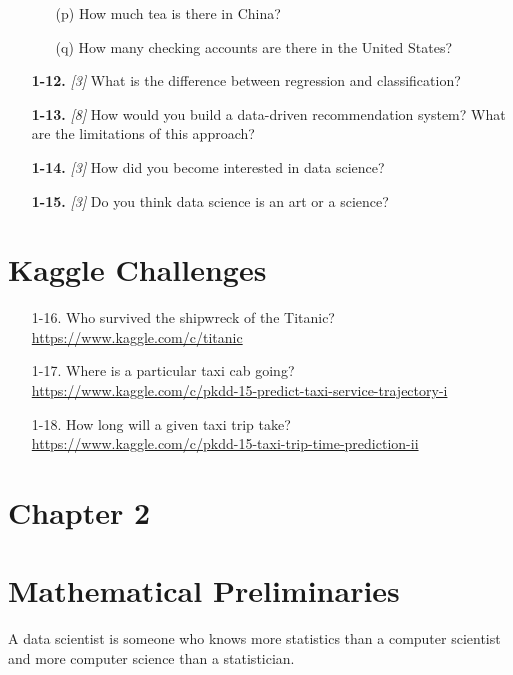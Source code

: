 \documentclass[10pt]{article}
\begin{document}
\begin{enumerate}
\begin{enumerate}
        \item [(p)] How much tea is there in China?
        \item [(q)] How many checking accounts are there in the United States?
    \end{enumerate}
    \item[\textbf{1-12.}] \textit{[3] } What is the difference between regression and classification?\\
    \item[\textbf{1-13.}] \textit{[8] } How would you build a data-driven recommendation system? What are the limitations of this approach?\\
    \item[\textbf{1-14.}] \textit{[3] } How did you become interested in data science?\\
    \item[\textbf{1-15.}] \textit{[3] } Do you think data science is an art or a science?
\end{enumerate}

\section*{Kaggle Challenges}
\begin{enumerate}
    \item[1-16.] Who survived the shipwreck of the Titanic?\\ \href{https://www.kaggle.com/c/titanic}{https://www.kaggle.com/c/titanic}
    \item[1-17.] Where is a particular taxi cab going? \\ \href{https://www.kaggle.com/c/pkdd-15-predict-taxi-service-trajectory-i}{https://www.kaggle.com/c/pkdd-15-predict-taxi-service-trajectory-i}
    \item[1-18.] How long will a given taxi trip take? \\
    \href{https://www.kaggle.com/c/pkdd-15-taxi-trip-time-prediction-ii}{https://www.kaggle.com/c/pkdd-15-taxi-trip-time-prediction-ii}
\end{enumerate}

\section*{Chapter 2}

\section*{Mathematical Preliminaries}
A data scientist is someone who knows more statistics than a computer scientist and more computer science than a statistician.
\end{document}
